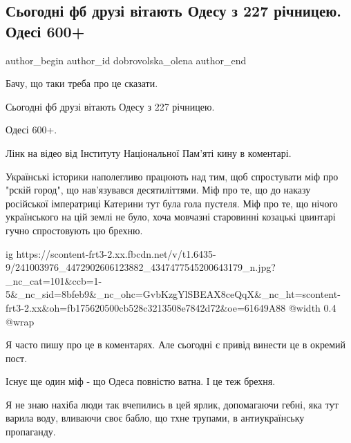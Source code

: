  
 
 
 
 
 
\subsection{Сьогодні фб друзі вітають Одесу з 227 річницею. Одесі 600+}
\label{sec:02_09_2021.fb.dobrovolska_olena.1.odessa_den_goroda}
 
\ifcmt
 author_begin
   author_id dobrovolska_olena
 author_end
\fi

Бачу, що таки треба про це сказати.

Сьогодні фб друзі вітають Одесу з 227 річницею.

Одесі 600+.

Лінк на відео від Інституту Національної Пам'яті кину в коментарі.

Українські історики наполегливо працюють над тим, щоб спростувати міф про
"рскій город", що нав'язувався десятиліттями. Міф про те, що до наказу
російської імператриці Катерини тут була гола пустеля. Міф про те, що нічого
українського на цій землі не було, хоча мовчазні старовинні козацькі цвинтарі
гучно спростовують цю брехню.

\ifcmt
  ig https://scontent-frt3-2.xx.fbcdn.net/v/t1.6435-9/241003976_4472902606123882_4347477545200643179_n.jpg?_nc_cat=101&ccb=1-5&_nc_sid=8bfeb9&_nc_ohc=GvbKzgYlSBEAX8ceQqX&_nc_ht=scontent-frt3-2.xx&oh=fb175620500cb528c3213508e7842d72&oe=61649A88
  @width 0.4
  @wrap 
\fi

Я часто пишу про це в коментарях. Але сьогодні є привід винести це в окремий пост.

Існує ще один міф - що Одеса повністю ватна. І це теж брехня. 

Я не знаю нахіба люди так вчепились в цей ярлик, допомагаючи гебні, яка тут
варила воду, вливаючи своє бабло, що тхне трупами, в антиукраїнську пропаганду.

